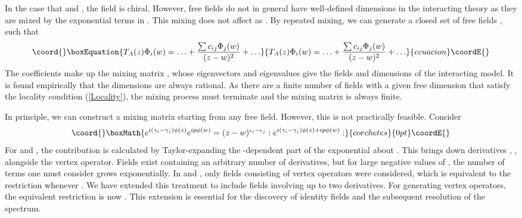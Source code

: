\documentclass[a4paper,a4paper]{article}
\begin{document}
In the case that \coordHE{} and \coordHE{}, the field is chiral. However,
free fields do not in general have well-defined dimensions in the interacting theory
as they are mixed by the exponential terms in \coordHE{}. 
This mixing does not affect \coordHE{} as \coordHE{}. 
By repeated mixing, we can generate a closed set of
free fields \coordHE{}, such that
\begin{equation}\coord{}\boxEquation{
T_A(z)\Phi_i(w) = \ldots + \frac{\sum c_{ij} \Phi_j(w)}{(z-w)^2} + \ldots
}{
T_A(z)\Phi_i(w) = \ldots + \frac{\sum c_{ij} \Phi_j(w)}{(z-w)^2} + \ldots
}{ecuacion}\coordE{}\end{equation}
The coefficients \coordHE{} make up the mixing matrix \coordHE{}, whose eigenvectors and eigenvalues give
the fields and dimensions of the interacting model. 
It is found empirically that the dimensions are always rational\cite{Gepner}. As
there are a finite number of fields with a given free dimension that satisfy the locality condition
(\ref{Locality}), the mixing process must terminate
and the mixing matrix is always finite. 

In principle, we can construct a mixing matrix starting from any free field. However, this is not practically feasible.
Consider 
\begin{displaymath}\coord{}\boxMath{
e^{i(\gamma_i - \gamma_j)\phi(z)} e^{ip\phi(w)} = (z - w)^{\epsilon_i - \epsilon_j} : e^{i(\gamma_i - \gamma_j)\phi(z) + ip\phi(w)} :
}{corchetes}{0pt}\coordE{}\end{displaymath}
For \coordHE{} and \coordHE{}, the \coordHE{} contribution is calculated by Taylor-expanding the 
\coordHE{}-dependent part of the exponential about \coordHE{}. This brings down derivatives \coordHE{},
\coordHE{}, \myHighlight{$\ldots$}\coordHE{} alongside the vertex operator. 
Fields exist containing an arbitrary number of derivatives, but for large negative values of \coordHE{},
the number of terms one must consider grows exponentially. In \cite{Gepner} and \cite{Cohen}, only
fields consisting of vertex operators were considered,
which is equivalent to the restriction \coordHE{}
 whenever \coordHE{}.
We have extended this treatment to include fields involving up to two derivatives.
For generating vertex operators, the equivalent restriction is now
\coordHE{}. 
This extension is essential for the discovery of identity fields and the subsequent resolution
of the spectrum. 
\end{document}
